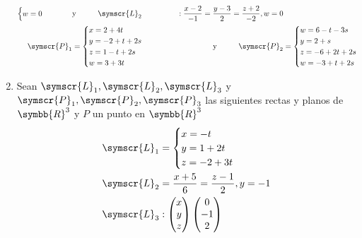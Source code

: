 \documentclass{article}
\def\fancyL{\symscr{L}}
\def\fancyP{\symscr{P}}
\def\realR{\symbb{R}}
\begin{document}
\begin{enumerate}
\[\begin{aligned}
\begin{cases}
                w = 0
            \end{cases}
            \hspace{1cm}
            &\text{y}
            \hspace{1cm}
            \fancyL_2 &:
            \frac{x - 2}{-1} =
            \frac{y - 3}{2} =
            \frac{z + 2}{-2}, w = 0 \\
            \fancyP_1 &=
            \begin{cases}
                x = 2 + 4t \\
                y = -2 + t + 2s \\
                z = 1 -t + 2s \\
                w = 3 + 3t
            \end{cases}
            \hspace{1cm}
            &\text{y}
            \hspace{1cm}
            \fancyP_2 &=
            \begin{cases}
                w = 6 - t - 3s \\
                y = 2 + s \\
                z = -6 + 2t + 2s \\
                w = -3 + t + 2s
            \end{cases}
        \end{aligned}
    \]
\item Sean \(\fancyL_1, \fancyL_2, \fancyL_3\) y \(\fancyP_1, \fancyP_2, \fancyP_3\) las siguientes rectas y planos de \(\realR^3\) y \(P\) un punto en \(\realR^3\)
    \[
        \begin{aligned}
            \fancyL_1 &=
            \begin{cases}
                x = -t \\
                y = 1 + 2t \\
                z = -2 + 3t
            \end{cases} \\
            \fancyL_2 &=
            \frac{x + 5}{6} =
            \frac{z - 1}{2},
            y = -1 \\
            \fancyL_3 &: 
            \begin{pmatrix}x \\ y \\ z\end{pmatrix}
            \begin{pmatrix}0 \\ -1 \\ 2\end{pmatrix}

\end{aligned}\]
\end{enumerate}
\end{document}
